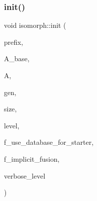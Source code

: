 \mbox{\label{classisomorph_ad10f09aafccb67e0871404d61a68e0d9}} 
\subsubsection{\texorpdfstring{init()}{init()}}
{\footnotesize\ttfamily void isomorph\+::init (\begin{DoxyParamCaption}\item[{const \mbox{\hyperlink{galois_8h_ab6cc7b4aeb6ea31aba2b3fbfc83ff5e6}{B\+Y\+TE}} $\ast$}]{prefix,  }\item[{\mbox{\hyperlink{classaction}{action}} $\ast$}]{A\+\_\+base,  }\item[{\mbox{\hyperlink{classaction}{action}} $\ast$}]{A,  }\item[{\mbox{\hyperlink{classgenerator}{generator}} $\ast$}]{gen,  }\item[{\mbox{\hyperlink{galois_8h_a09fddde158a3a20bd2dcadb609de11dc}{I\+NT}}}]{size,  }\item[{\mbox{\hyperlink{galois_8h_a09fddde158a3a20bd2dcadb609de11dc}{I\+NT}}}]{level,  }\item[{\mbox{\hyperlink{galois_8h_a09fddde158a3a20bd2dcadb609de11dc}{I\+NT}}}]{f\+\_\+use\+\_\+database\+\_\+for\+\_\+starter,  }\item[{\mbox{\hyperlink{galois_8h_a09fddde158a3a20bd2dcadb609de11dc}{I\+NT}}}]{f\+\_\+implicit\+\_\+fusion,  }\item[{\mbox{\hyperlink{galois_8h_a09fddde158a3a20bd2dcadb609de11dc}{I\+NT}}}]{verbose\+\_\+level }\end{DoxyParamCaption})}

\mbox{\label{classisomorph_acae208131143734575c088b5f50123f6}} 
